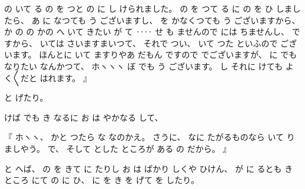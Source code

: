 の
いて
る
の
を
つと%
の
に
し
けられました。
%
の
を
つて
る
に
の
を
ひ
しましたら、
%
あ
に
なつても
う
ございますし、
%
を
かなくつても
う
ございますから、
%
か
の
の
かの
%
へ
いて
きたい
が
て
‥‥
せ
も
ませんので
には
ちませんし、
%
ですから、
%
いては
さいますまいつて、
%
それで
つい、
%
いて
つた
といふので
ございます。
%
ほんとに
いて
ますりやあ
だもん
ですので
でございますが、
%
に
でも
なりたい
なんかつて、
%
ホヽヽヽ
ぼ
でも
う
ございます。
%
し
それに
けても
よく〳〵だと
はれます。
』

%
と
げたり。

%
けば
でも
き
なるに
お
は
やかなる
して、

%
『
ホヽヽ、
%
かと
つたら
な
なのかえ。
%
さうに、
%
なに
たがるものなら
いて
りましやう。
%
で、%
%
そして
とした
ところが
ある
の
だから。
』

%
と
へば、
%
の
を
きて
に
たりし
お
は
ばかり
しくや
ひけん、
%
が
に
るとも
き
ところ
にて
の
に
ひ、
%
に
を
き
を
げて
を
したり。

